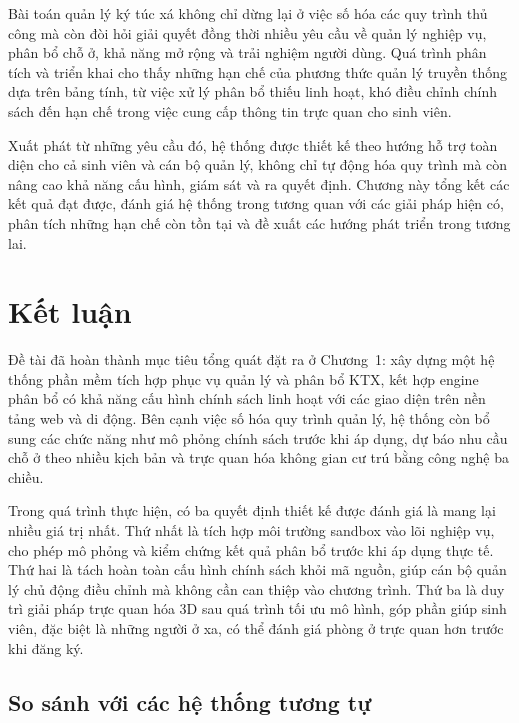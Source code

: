 \documentclass[../DoAn.tex]{subfiles}
\begin{document}
\sloppy

Bài toán quản lý ký túc xá không chỉ dừng lại ở việc số hóa các quy trình thủ công mà còn đòi hỏi giải quyết đồng thời nhiều yêu cầu về quản lý nghiệp vụ, phân bổ chỗ ở, khả năng mở rộng và trải nghiệm người dùng. Quá trình phân tích và triển khai cho thấy những hạn chế của phương thức quản lý truyền thống dựa trên bảng tính, từ việc xử lý phân bổ thiếu linh hoạt, khó điều chỉnh chính sách đến hạn chế trong việc cung cấp thông tin trực quan cho sinh viên.

Xuất phát từ những yêu cầu đó, hệ thống được thiết kế theo hướng hỗ trợ toàn diện cho cả sinh viên và cán bộ quản lý, không chỉ tự động hóa quy trình mà còn nâng cao khả năng cấu hình, giám sát và ra quyết định. Chương này tổng kết các kết quả đạt được, đánh giá hệ thống trong tương quan với các giải pháp hiện có, phân tích những hạn chế còn tồn tại và đề xuất các hướng phát triển trong tương lai.


\section{Kết luận}
\label{section:6.1}

Đề tài đã hoàn thành mục tiêu tổng quát đặt ra ở Chương~1: xây dựng một hệ thống phần mềm tích hợp phục vụ quản lý và phân bổ KTX, kết hợp engine phân bổ có khả năng cấu hình chính sách linh hoạt với các giao diện trên nền tảng web và di động. Bên cạnh việc số hóa quy trình quản lý, hệ thống còn bổ sung các chức năng như mô phỏng chính sách trước khi áp dụng, dự báo nhu cầu chỗ ở theo nhiều kịch bản và trực quan hóa không gian cư trú bằng công nghệ ba chiều.

Trong quá trình thực hiện, có ba quyết định thiết kế được đánh giá là mang lại nhiều giá trị nhất. Thứ nhất là tích hợp môi trường sandbox vào lõi nghiệp vụ, cho phép mô phỏng và kiểm chứng kết quả phân bổ trước khi áp dụng thực tế. Thứ hai là tách hoàn toàn cấu hình chính sách khỏi mã nguồn, giúp cán bộ quản lý chủ động điều chỉnh mà không cần can thiệp vào chương trình. Thứ ba là duy trì giải pháp trực quan hóa 3D sau quá trình tối ưu mô hình, góp phần giúp sinh viên, đặc biệt là những người ở xa, có thể đánh giá phòng ở trực quan hơn trước khi đăng ký.


\subsection{So sánh với các hệ thống tương tự}
\label{subsection:6.1.1}
\end{document}

